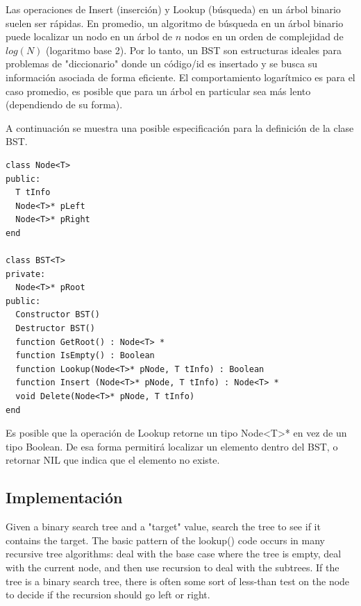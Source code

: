 Las operaciones de Insert (inserción) y Lookup (búsqueda) en un árbol binario suelen ser rápidas. En promedio, un algoritmo de búsqueda en un árbol binario puede localizar un nodo en un árbol de $n$ nodos en un orden de complejidad de $log(N)$ (logaritmo base 2). Por lo tanto, un BST son estructuras ideales para problemas de "diccionario" donde un código/id es insertado y se busca su información asociada de forma eficiente. El comportamiento logarítmico es para el caso promedio, es posible que para un árbol en particular sea más lento (dependiendo de su forma).

A continuación se muestra una posible especificación para la definición de la clase BST.

\begin{lstlisting}[upquote=true, language=pseudo]
class Node<T>
public:
  T tInfo
  Node<T>* pLeft
  Node<T>* pRight
end

class BST<T>
private:
  Node<T>* pRoot
public:
  Constructor BST()
  Destructor BST()
  function GetRoot() : Node<T> *
  function IsEmpty() : Boolean
  function Lookup(Node<T>* pNode, T tInfo) : Boolean
  function Insert (Node<T>* pNode, T tInfo) : Node<T> *
  void Delete(Node<T>* pNode, T tInfo)
end
\end{lstlisting}

Es posible que la operación de Lookup retorne un tipo Node<T>* en vez de un tipo Boolean. De esa forma permitirá localizar un elemento dentro del BST, o retornar NIL que indica que el elemento no existe.

\subsection{Implementación}

Given a binary search tree and a "target" value, search the tree to see if it contains the target. The basic pattern of the lookup() code occurs in many recursive tree algorithms: deal with the base case where the tree is empty, deal with the current node, and then use recursion to deal with the subtrees. If the tree is a binary search tree, there is often some sort of less-than test on the node to decide if the recursion should go left or right.

